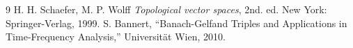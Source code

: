 \documentclass[11pt,a4paper,reqno]{amsart}
\numberwithin{equation}{section}
\theoremstyle{definition}
\theoremstyle{definition}
\begin{document}
\begin{thebibliography}{9}
    H. H. Schaefer, M. P. Wolff
    \emph{Topological vector spaces}, 2nd. ed.
    New York: Springer-Verlag,
    1999.
    S. Bannert,
    ``Banach-Gelfand Triples and Applications in Time-Frequency Analysis,''
    Universität Wien, 2010.

\end{thebibliography}
\end{document}
